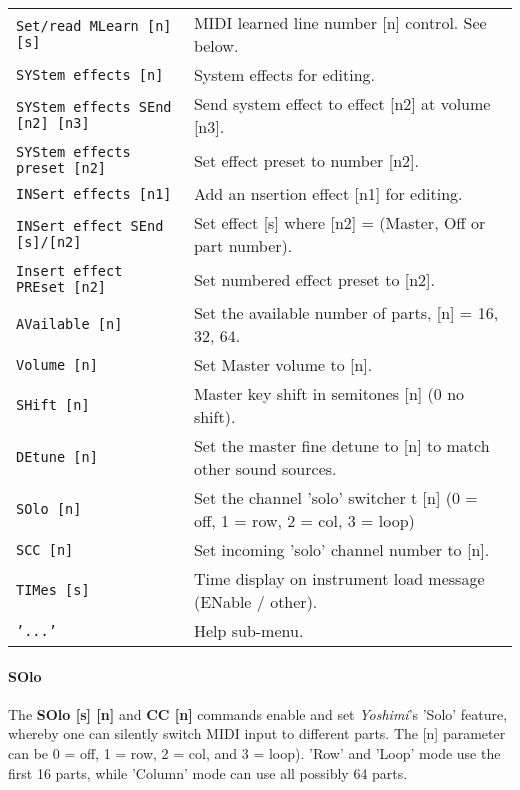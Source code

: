 \begin{table}[H]
\begin{tabular}{l l}
\texttt{Set/read MLearn [n] [s]} &
   MIDI learned line number [n] control.  See below. \\
\texttt{SYStem effects [n]} &
   System effects for editing. \\
\texttt{SYStem effects SEnd [n2] [n3]} &
   Send system effect to effect [n2] at volume [n3]. \\
\texttt{SYStem effects preset [n2]} &
   Set effect preset to number [n2]. \\
\texttt{INSert effects [n1]} &
   Add an nsertion effect [n1] for editing. \\
\texttt{INSert effect SEnd [s]/[n2]} &
   Set effect [s] where [n2] = (Master, Off or part number). \\
\texttt{Insert effect PREset [n2]} &
   Set numbered effect preset to [n2]. \\
\texttt{AVailable [n]} &
   Set the available number of parts, [n] = 16, 32, 64. \\
\texttt{Volume [n]} &
   Set Master volume to [n]. \\
\texttt{SHift [n]} &
   Master key shift in semitones [n] (0 no shift). \\
\texttt{DEtune [n]} &
   Set the master fine detune to [n] to match other sound sources. \\
\texttt{SOlo [n]} &
   Set the channel 'solo' switcher t [n]
   (0 = off, 1 = row, 2 = col, 3 = loop) \\
\texttt{SCC [n]} &
   Set incoming 'solo' channel number to [n]. \\
\texttt{TIMes [s]} &
   Time display on instrument load message (ENable / other). \\
\texttt{'...'} &
   Help sub-menu. \\

      \end{tabular}
   \end{table}

\paragraph{SOlo}
\label{paragraph:command_line_solo}

   The \textbf{SOlo [s] [n]} and \textbf{CC [n]}
   commands enable and set \textsl{Yoshimi}'s 'Solo' feature,
   whereby one can silently switch MIDI input to different parts.
   The [n] parameter can be 0 = off, 1 = row, 2 = col, and 3 = loop).
   'Row' and 'Loop' mode use the first 16 parts, while
   'Column' mode can use all possibly 64 parts.

